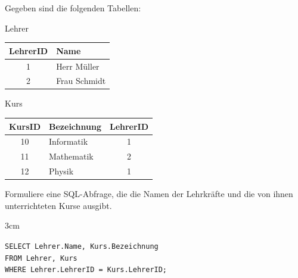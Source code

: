 \question[3]
Gegeben sind die folgenden Tabellen:

\begin{center}
\begin{minipage}[t]{0.45\textwidth}

Lehrer \\

\begin{tabular}{|c|l|}
\hline
LehrerID & Name \\
\hline
1 & Herr Müller \\
2 & Frau Schmidt \\
\hline
\end{tabular}
\end{minipage}
\hfill
\begin{minipage}[t]{0.45\textwidth}

Kurs \\

\begin{tabular}{|c|l|c|}
\hline
KursID & Bezeichnung & LehrerID \\
\hline
10 & Informatik & 1 \\
11 & Mathematik & 2 \\
12 & Physik & 1 \\
\hline
\end{tabular}
\end{minipage}
\end{center}

Formuliere eine SQL-Abfrage, die die Namen der Lehrkräfte und die von ihnen unterrichteten Kurse ausgibt.

\begin{solutionbox}{3cm}

\texttt{SELECT Lehrer.Name, Kurs.Bezeichnung}\\
\texttt{FROM Lehrer, Kurs}\\
\texttt{WHERE Lehrer.LehrerID = Kurs.LehrerID;}

\vspace{0.3cm}

\end{solutionbox}